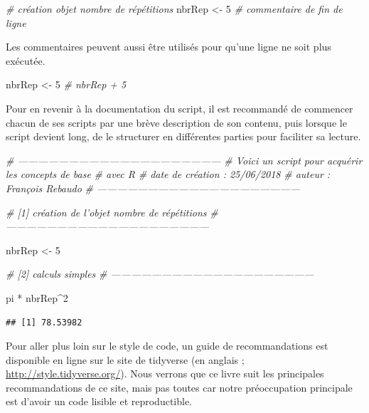 \documentclass[twoside,symmetric]{book}
\newenvironment{Shaded}{}{}
\newcommand{\CommentTok}[1]{\textit{#1}}
\newcommand{\DecValTok}[1]{#1}
\newcommand{\NormalTok}[1]{#1}
\newcommand{\OperatorTok}[1]{#1}
\newcommand{\StringTok}[1]{#1}
\begin{document}
\begin{Shaded}
\begin{Highlighting}[]
\CommentTok{# création objet nombre de répétitions}
\NormalTok{nbrRep <-}\StringTok{ }\DecValTok{5} \CommentTok{# commentaire de fin de ligne}
\end{Highlighting}
\end{Shaded}

Les commentaires peuvent aussi être utilisés pour qu'une ligne ne soit plus exécutée.

\begin{Shaded}
\begin{Highlighting}[]
\NormalTok{nbrRep <-}\StringTok{ }\DecValTok{5}
\CommentTok{# nbrRep + 5}
\end{Highlighting}
\end{Shaded}

Pour en revenir à la documentation du script, il est recommandé de commencer chacun de ses scripts par une brève description de son contenu, puis lorsque le script devient long, de le structurer en différentes parties pour faciliter sa lecture.

\begin{Shaded}
\begin{Highlighting}[]
\CommentTok{# ------------------------------------------------------------}
\CommentTok{# Voici un script pour acquérir les concepts de base }
\CommentTok{# avec R}
\CommentTok{# date de création : 25/06/2018}
\CommentTok{# auteur : François Rebaudo}
\CommentTok{# ------------------------------------------------------------}

\CommentTok{# [1] création de l'objet nombre de répétitions}
\CommentTok{# ------------------------------------------------------------}

\NormalTok{nbrRep <-}\StringTok{ }\DecValTok{5}

\CommentTok{# [2] calculs simples}
\CommentTok{# ------------------------------------------------------------}

\NormalTok{pi }\OperatorTok{*}\StringTok{ }\NormalTok{nbrRep}\OperatorTok{^}\DecValTok{2}
\end{Highlighting}
\end{Shaded}

\begin{verbatim}
## [1] 78.53982
\end{verbatim}

Pour aller plus loin sur le style de code, un guide de recommandations est disponible en ligne sur le site de tidyverse (en anglais ; \url{http://style.tidyverse.org/}). Nous verrons que ce livre suit les principales recommandations de ce site, mais pas toutes car notre préoccupation principale est d'avoir un code lisible et reproductible.
\end{document}
